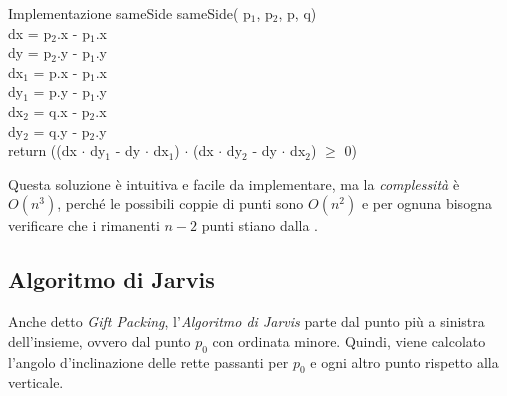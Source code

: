 \begin{minicode}{Implementazione sameSide}
\ind{} sameSide( p$_1$,  p$_2$,  p,  q)\\
     dx = p$_2$.x - p$_1$.x\\
     dy = p$_2$.y - p$_1$.y\\
     dx$_1$ = p.x - p$_1$.x\\
     dy$_1$ = p.y - p$_1$.y\\
     dx$_2$ = q.x - p$_2$.x\\
     dy$_2$ = q.y - p$_2$.y\\
    return ((dx $\cdot$ dy$_1$ - dy $\cdot$ dx$_1$) $\cdot$
    (dx $\cdot$ dy$_2$ - dy $\cdot$ dx$_2$) $\geq$ 0)
\end{minicode}

\noindent
Questa soluzione è intuitiva e facile da implementare, ma la \emph{complessità}
è $O(n^3)$, perché le possibili coppie di punti sono $O(n^2)$ e per ognuna bisogna
verificare che i rimanenti $n-2$ punti stiano dalla .

\subsection{Algoritmo di Jarvis}
Anche detto \emph{Gift Packing}, l'\emph{Algoritmo di Jarvis} parte dal punto
più a sinistra dell'insieme, ovvero dal punto $p_0$ con ordinata minore. Quindi,
viene calcolato l'angolo d'inclinazione delle rette passanti per $p_0$ e
ogni altro punto rispetto alla verticale. 

